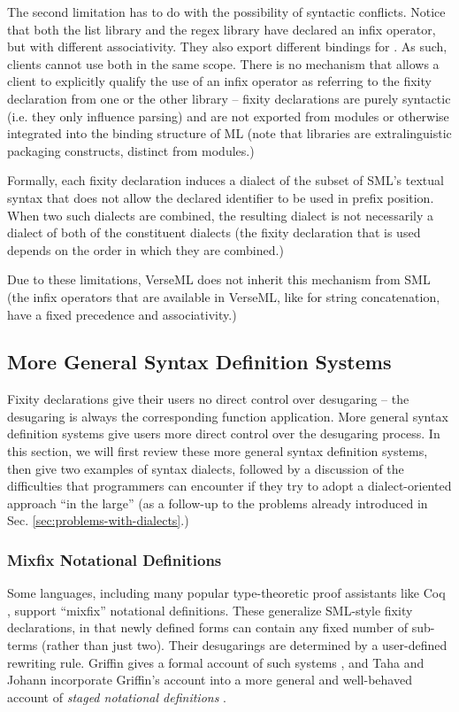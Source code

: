 The second limitation has to do with the possibility of syntactic conflicts. Notice that both the list library and the regex library have declared \li{::} an  infix operator, but with different associativity. They also export different bindings for . As such, clients cannot use both in the same scope. There is no mechanism that allows a client to explicitly qualify the use of an infix operator as referring to the fixity declaration from one or the other library -- fixity declarations are purely syntactic (i.e. they only influence parsing) and are not exported from modules or otherwise integrated into the binding structure of ML (note that libraries are extralinguistic packaging constructs, distinct from modules.) 


Formally, each fixity declaration induces a dialect of the subset of SML's textual syntax that does not allow the declared identifier to be used in prefix position. When two such dialects are combined, the resulting dialect is not necessarily a dialect of both of the constituent dialects (the fixity declaration that is used depends on the order in which they are combined.)

Due to these limitations, VerseML does not inherit this mechanism from SML (the infix operators that are available in VerseML, like \li{^} for string concatenation, have a fixed precedence and associativity.)


\subsection{More General Syntax Definition Systems}\label{sec:syntax-dialects}
Fixity declarations give their users no direct control over desugaring -- the desugaring is always the corresponding function application. More general syntax definition systems give users more direct control over the desugaring process. In this section, we will first review these more general syntax definition systems, then give two examples of syntax dialects, followed by a discussion of the difficulties that programmers can encounter if they try to adopt a dialect-oriented approach ``in the large'' (as a follow-up to the problems already introduced in Sec. \ref{sec:problems-with-dialects}.)

\subsubsection{Mixfix Notational Definitions}
Some languages, including many popular type-theoretic proof assistants like Coq \cite{Coq:manual}, support ``mixfix'' notational definitions. These generalize SML-style fixity declarations, in that newly defined forms can contain any fixed number of sub-terms (rather than just two). Their desugarings are determined by a user-defined rewriting rule. Griffin gives a formal account of such systems \cite{5134}, and Taha and Johann incorporate Griffin's account into a more general and  well-behaved account of \emph{staged notational definitions} \cite{Taha2003}.

